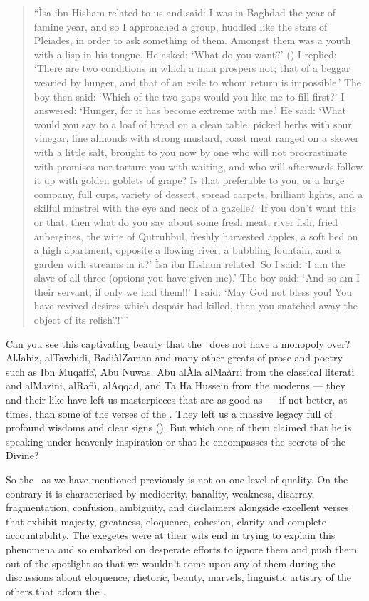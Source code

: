 \documentclass[12pt]{memoir}
\begin{document}
\begin{quote}
“\`Isa ibn Hisham related to us and said: I was in Baghdad the year of
famine year, and so I approached a group,
huddled like the stars of Pleiades, in order to ask something of them.
Amongst them was a youth with a lisp in his tongue.
He asked: ‘What do you want?’
()
I replied: ‘There are two conditions in which a man prospers not;
that of a beggar wearied by hunger,
and that of an exile to whom return is impossible.’
The boy then said: ‘Which of the two gaps would you like me to fill first?’
I answered: ‘Hunger, for it has become extreme with me.’
He said: ‘What would you say to a loaf of bread on a clean table,
picked herbs with sour vinegar, fine almonds with strong mustard,
roast meat ranged on a skewer with a little salt,
brought to you now by one who will not procrastinate with promises
nor torture you with waiting, and who will afterwards follow it up
with golden goblets of grape? Is that preferable to you, or a large company,
full cups, variety of dessert, spread carpets, brilliant lights,
and a skilful minstrel with the eye and neck of a gazelle?
‘If you don’t want this or that, then what do you say about some fresh meat,
river fish, fried aubergines, the wine of Qutrubbul,
freshly harvested apples, a soft bed on a high apartment,
opposite a flowing river, a bubbling fountain,
and a garden with streams in it?’
\`Isa ibn Hisham related: So I said: ‘I am the slave of all three
(options you have given me).’
The boy said: ‘And so am I their servant, if only we had them!!’
I said: ‘May God not bless you! You have revived desires which
despair had killed, then you snatched away the object of its relish?!’”
\end{quote}

Can you see this captivating beauty that
the \Quran\ does not have a monopoly over?
Al\–Jahiz, al\–Tawhidi, Badi\` al\–Zaman
and many other greats of prose and poetry
such as Ibn Muqaffa\`, Abu Nuwas, Abu al\–\`Ala al\–Ma\`arri
from the classical literati and al\–Mazini, al\–Rafi\`i, al\–Aqqad,
and Ta Ha Hussein from the moderns —
they and their like have left us masterpieces that are as good as —
if not better, at times, than some of the verses of the \Quran.
They left us a massive legacy full of profound wisdoms and clear signs
().
But which one of them claimed that he is speaking under heavenly inspiration
or that he encompasses the secrets of the Divine?

So the \Quran\ as we have mentioned previously is not on one level of quality.
On the contrary it is characterised by mediocrity, banality, weakness,
disarray, fragmentation, confusion, ambiguity,
and disclaimers alongside excellent verses that exhibit
majesty, greatness, eloquence, cohesion, clarity and complete accountability.
The exegetes were at their wits end in trying to explain this phenomena
and so embarked on desperate efforts to ignore them and push them out of
the spotlight so that we wouldn’t come upon any of them during
the discussions about eloquence, rhetoric, beauty, marvels, linguistic
artistry of the others that adorn the \Quran.
\end{document}
